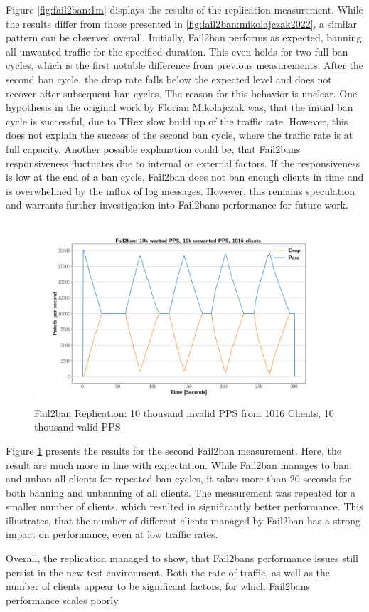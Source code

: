 Figure \ref{fig:fail2ban:1m} displays the results of the replication measurement. While the results differ from those presented in \ref{fig:fail2ban:mikolajczak2022},
a similar pattern can be observed overall. Initially, Fail2ban performs as expected, banning all unwanted traffic for the specified duration. This even holds
for two full ban cycles, which is the first notable difference from previous measurements. After the second ban cycle, the drop rate falls below the expected level and
does not recover after subsequent ban cycles. The reason for this behavior is unclear. One hypothesis in the original work by
Florian Mikolajczak was, that the initial ban cycle is successful, due to TRex slow build up of the traffic rate. However, this does not explain the success
of the second ban cycle, where the traffic rate is at full capacity. Another possible explanation could be, that Fail2bans responsiveness fluctuates due to internal or external factors.
If the responsiveness is low at the end of a ban cycle, Fail2ban does not ban enough clients in time and is overwhelmed by the influx of log messages. However, this remains speculation and warrants
further investigation into Fail2bans performance for future work.
\par
\begin{figure}[h!]
    \centerline{\includegraphics[width=1.2\textwidth]{images/fail2ban_v10k_iv10k_c1016.png}}
    \caption[Fail2Ban Replication: 10k PPS, 1016 Clients]{Fail2ban Replication: 10 thousand invalid \ac{PPS} from 1016 Clients, 10 thousand valid \ac{PPS}}
	\label{fig:fail2ban:10k}
\end{figure}
Figure \ref{fig:fail2ban:10k} presents the results for the second Fail2ban measurement. Here, the result are much more in line with expectation. While Fail2ban manages 
to ban and unban all clients for repeated ban cycles, it takes more than 20 seconds for both banning and unbanning of all clients. The measurement was repeated for a smaller number of clients, which
resulted in significantly better performance. This illustrates, that the number of different clients managed by Fail2ban
has a strong impact on performance, even at low traffic rates. 
\par 
Overall, the replication managed to show, that Fail2bans performance issues still persist in the new test environment. Both the rate of traffic, as well as the number of clients appear
to be significant factors, for which Fail2bans performance scales poorly.  


